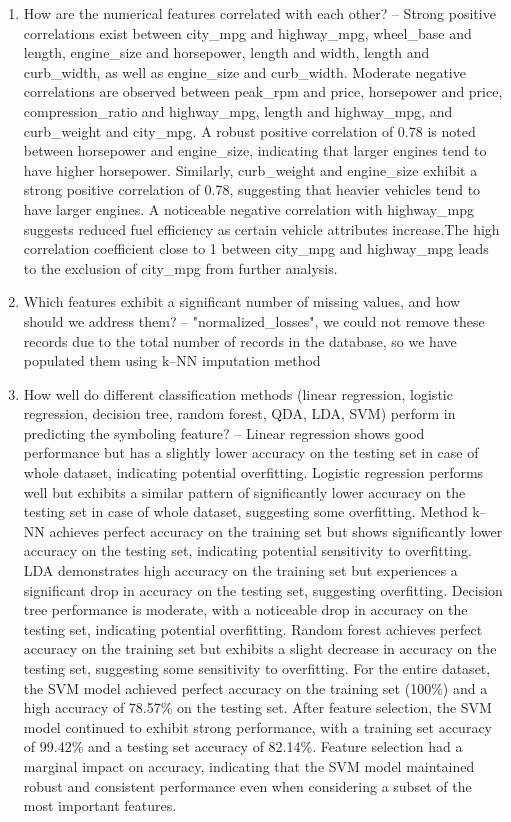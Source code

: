 \documentclass[11pt,a4paper]{article}\usepackage[]{graphicx}\usepackage[]{xcolor}
\begin{document}
\begin{enumerate}
\item How are the numerical features correlated with each other? -- Strong positive correlations exist between city\_mpg and highway\_mpg, wheel\_base and length, engine\_size and horsepower, length and width, length and curb\_width, as well as engine\_size and curb\_width. Moderate negative correlations are observed between peak\_rpm and price, horsepower and price, compression\_ratio and highway\_mpg, length and highway\_mpg, and curb\_weight and city\_mpg. A robust positive correlation of 0.78 is noted between horsepower and engine\_size, indicating that larger engines tend to have higher horsepower. Similarly, curb\_weight and engine\_size exhibit a strong positive correlation of 0.78, suggesting that heavier vehicles tend to have larger engines. A noticeable negative correlation with highway\_mpg suggests reduced fuel efficiency as certain vehicle attributes increase.The high correlation coefficient close to 1 between city\_mpg and highway\_mpg leads to the exclusion of city\_mpg from further analysis.



\item Which features exhibit a significant number of missing values, and how should
we address them? -- "normalized\_losses", we could not remove these records due to the total number of records in the database, so we have populated them using k--NN imputation method 


\item How well do different classification methods (linear regression, logistic regression, decision tree, random forest, QDA, LDA, SVM) perform in predicting the symboling feature? -- Linear regression shows good performance but has a slightly lower accuracy on the testing set in case of whole dataset, indicating potential overfitting. Logistic regression performs well but exhibits a similar pattern of significantly lower accuracy on the testing set in case of whole dataset, suggesting some overfitting.  Method k--NN achieves perfect accuracy on the training set but shows significantly lower accuracy on the testing set, indicating potential sensitivity to overfitting. LDA demonstrates high accuracy on the training set but experiences a significant drop in accuracy on the testing set, suggesting overfitting. Decision tree performance is moderate, with a noticeable drop in accuracy on the testing set, indicating potential overfitting. Random forest achieves perfect accuracy on the training set but exhibits a slight decrease in accuracy on the testing set, suggesting some sensitivity to overfitting. For the entire dataset, the SVM model achieved perfect accuracy on the training set (100\%) and a high accuracy of 78.57\% on the testing set.
After feature selection, the SVM model continued to exhibit strong performance, with a training set accuracy of 99.42\% and a testing set accuracy of 82.14\%.
Feature selection had a marginal impact on accuracy, indicating that the SVM model maintained robust and consistent performance even when considering a subset of the most important features.



\end{enumerate}
\end{document}
